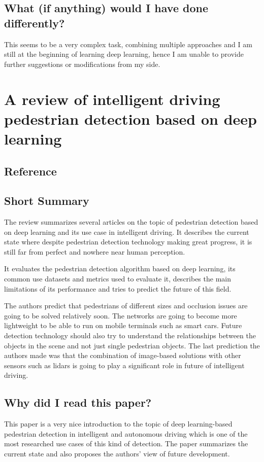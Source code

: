\documentclass[11pt,a4paper]{article}
\begin{document}
\subsection*{What (if anything) would I have done differently?}
This seems to be a very complex task, combining multiple approaches and I am still at the beginning of learning deep learning, hence I am unable to provide further suggestions or modifications from my side.
\newpage 


\section*{A review of intelligent driving pedestrian detection based on deep learning}
\subsection*{Reference}

\subsection*{Short Summary} 
The review summarizes several articles on the topic of pedestrian detection based on deep learning and its use case in intelligent driving. It describes the current state where despite pedestrian detection technology making great progress, it is still far from perfect and nowhere near human perception.

It evaluates the pedestrian detection algorithm based on deep learning, its common use datasets and metrics used to evaluate it, describes the main limitations of its performance and tries to predict the future of this field.

The authors predict that pedestrians of different sizes and occlusion issues are going to be solved relatively soon. The networks are going to become more lightweight to be able to run on mobile terminals such as smart cars. Future detection technology should also try to understand the relationships between the objects in the scene and not just single pedestrian objects. The last prediction the authors made was that the combination of image-based solutions with other sensors such as lidars is going to play a significant role in future of intelligent driving.
\subsection*{Why did I read this paper?}
This paper is a very nice introduction to the topic of deep learning-based pedestrian detection in intelligent and autonomous driving which is one of the most researched use cases of this kind of detection. The paper summarizes the current state and also proposes the authors’ view of future development.
\end{document}
